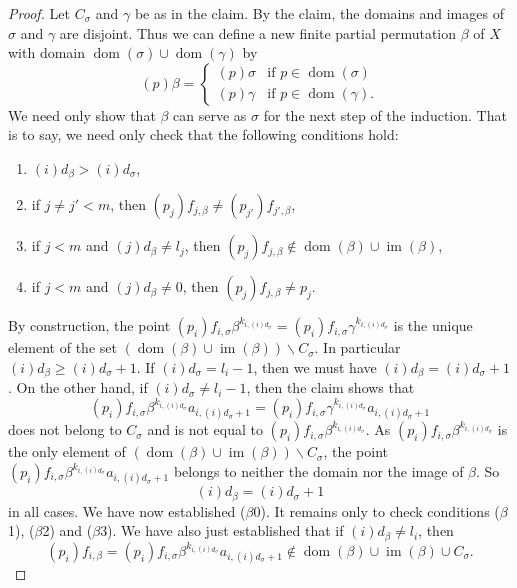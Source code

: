 \documentclass[10pt,a4paper]{amsart}
\newcommand{\dom}{\operatorname{dom}}
\newcommand{\im}{\operatorname{im}}
\begin{document}
\begin{proof}
     Let \(C_\sigma\) and \(\gamma\) be as in the claim.
     By the claim, the domains and images of \(\sigma\) and \(\gamma\) are disjoint. Thus we can define a new finite partial permutation \(\beta\) of \(X\) with domain \(\dom(\sigma)\cup \dom(\gamma)\) by
     \[(p)\beta = \begin{cases}
         (p)\sigma & \text{if } p\in\dom(\sigma)\\
         (p)\gamma & \text{if } p\in\dom(\gamma).
     \end{cases}\]
     We need only show that \(\beta\) can serve as \(\sigma\) for the next step of the induction. That is to say, we need only check that the following conditions hold:
\begin{enumerate}
\item[($\beta$0)]  \((i)d_{\beta}>(i)d_{\sigma}\),
      \item[($\beta$1)] if \(j\neq j'<m\), then \((p_j)f_{j,\beta}\neq (p_{j'})f_{j',\beta}\),
         \item[($\beta$2)] if \(j<m\) and \((j)d_\beta \neq l_j\), then  \((p_j)f_{j,\beta}\notin \dom(\beta)\cup \im(\beta)\),
         \item[($\beta$3)] if \(j<m\) and \((j)d_\beta\neq 0\), then  \((p_j)f_{j,\beta}\neq p_j\).
     \end{enumerate}
     
     By construction, the point
     \((p_i)f_{i,\sigma}\beta^{k_{i,(i)d_{\sigma}}}=(p_i)f_{i,\sigma}\gamma^{k_{i,(i)d_{\sigma}}}\) is the unique element of the set \((\dom(\beta)\cup \im(\beta)) \backslash C_\sigma\). In particular \((i)d_\beta\geq (i)d_\sigma+1\). If \((i)d_\sigma=l_i-1\), then we must have \((i)d_\beta=(i)d_\sigma+1\). On the other hand, if \((i)d_\sigma\neq l_i-1\), then the claim shows that \[(p_i)f_{i,\sigma}\beta^{k_{i,(i)d_{\sigma}}}a_{i,(i)d_\sigma+1}=(p_i)f_{i,\sigma}\gamma^{k_{i,(i)d_{\sigma}}}a_{i,(i)d_\sigma+1}\] does not belong to \(C_\sigma\) and is not equal to \((p_i)f_{i,\sigma}\beta^{k_{i,(i)d_{\sigma}}}\). As \((p_i)f_{i,\sigma}\beta^{k_{i,(i)d_{\sigma}}}\) is the only element of \((\dom(\beta)\cup \im(\beta)) \backslash C_\sigma\), the point \((p_i)f_{i,\sigma}\beta^{k_{i,(i)d_{\sigma}}}a_{i,(i)d_\sigma+1}\) belongs to neither the domain nor the image of \(\beta\). 
     So 
     \begin{equation}\tag{$*$}\label{eq:d+1}
         (i)d_\beta=(i)d_\sigma +1
        \end{equation}in all cases. We have now established ($\beta$0). It remains only to check conditions ($\beta$1), ($\beta$2) and ($\beta$3).
     We have also just established that if  \((i)d_\beta \neq l_i\), then 
     \begin{equation}\tag{$**$}\label{eq:newendnowhere}
         (p_i)f_{i,\beta}=(p_i)f_{i,\sigma}\beta^{k_{i,(i)d_{\sigma}}}a_{i,(i)d_\sigma+1}\notin \dom(\beta)\cup \im(\beta)\cup C_{\sigma}.
     \end{equation}


\end{proof}
\end{document}
